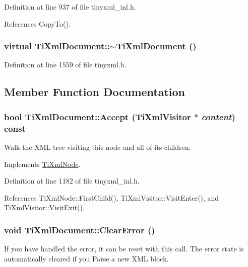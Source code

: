 Definition at line 937 of file tinyxml\_\-inl.h.

References CopyTo().\hypertarget{class_ti_xml_document_a1b8a035c2c2aab38e4387246a0b712c5}{
\subsubsection[{$\sim$TiXmlDocument}]{\setlength{\rightskip}{0pt plus 5cm}virtual TiXmlDocument::$\sim$TiXmlDocument ()}}
\label{class_ti_xml_document_a1b8a035c2c2aab38e4387246a0b712c5}


Definition at line 1559 of file tinyxml.h.

\subsection{Member Function Documentation}
\hypertarget{class_ti_xml_document_a3daab2f472418ef66315750202f762ae}{
\subsubsection[{Accept}]{\setlength{\rightskip}{0pt plus 5cm}bool TiXmlDocument::Accept ({\bf TiXmlVisitor} $\ast$ {\em content}) const}}
\label{class_ti_xml_document_a3daab2f472418ef66315750202f762ae}
Walk the XML tree visiting this node and all of its children. 

Implements \hyperlink{class_ti_xml_node_acc0f88b7462c6cb73809d410a4f5bb86}{TiXmlNode}.

Definition at line 1182 of file tinyxml\_\-inl.h.

References TiXmlNode::FirstChild(), TiXmlVisitor::VisitEnter(), and TiXmlVisitor::VisitExit().\hypertarget{class_ti_xml_document_ac66b8c28db86363315712a3574e87c35}{
\subsubsection[{ClearError}]{\setlength{\rightskip}{0pt plus 5cm}void TiXmlDocument::ClearError ()}}
\label{class_ti_xml_document_ac66b8c28db86363315712a3574e87c35}
If you have handled the error, it can be reset with this call. The error state is automatically cleared if you Parse a new XML block. 

